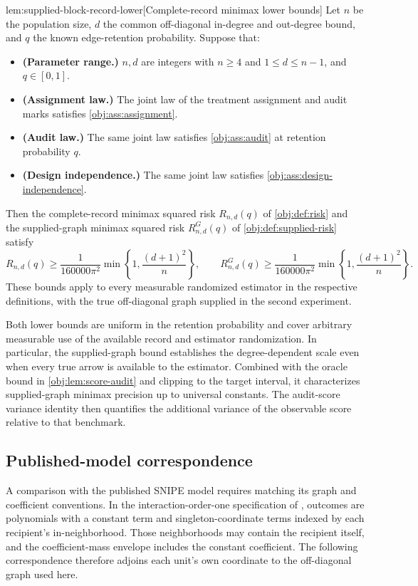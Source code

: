 \begin{lemmav}{lem:supplied-block-record-lower}[Complete-record minimax lower bounds]
Let \(n\) be the population size, \(d\) the common off-diagonal in-degree and out-degree bound, and \(q\) the known edge-retention probability. Suppose that:
\begin{itemize}
\item \textbf{(Parameter range.)} \(n,d\) are integers with \(n\ge4\) and \(1\le d\le n-1\), and \(q\in[0,1]\).
\item \textbf{(Assignment law.)} The joint law of the treatment assignment and audit marks satisfies \cref{obj:ass:assignment}.
\item \textbf{(Audit law.)} The same joint law satisfies \cref{obj:ass:audit} at retention probability \(q\).
\item \textbf{(Design independence.)} The same joint law satisfies \cref{obj:ass:design-independence}.
\end{itemize}
Then the complete-record minimax squared risk \(R_{n,d}(q)\) of \cref{obj:def:risk} and the supplied-graph minimax squared risk \(R^G_{n,d}(q)\) of \cref{obj:def:supplied-risk} satisfy
\[
R_{n,d}(q)\ge
\frac{1}{160000\pi^2}
\min\left\{1,\frac{(d+1)^2}{n}\right\},
\qquad
R^G_{n,d}(q)\ge
\frac{1}{160000\pi^2}
\min\left\{1,\frac{(d+1)^2}{n}\right\}.
\]
These bounds apply to every measurable randomized estimator in the respective definitions, with the true off-diagonal graph supplied in the second experiment.
\end{lemmav}

Both lower bounds are uniform in the retention probability and cover arbitrary measurable use of the available record and estimator randomization. In particular, the supplied-graph bound establishes the degree-dependent scale even when every true arrow is available to the estimator. Combined with the oracle bound in \cref{obj:lem:score-audit} and clipping to the target interval, it characterizes supplied-graph minimax precision up to universal constants. The audit-score variance identity then quantifies the additional variance of the observable score relative to that benchmark.

\subsection{Published-model correspondence}

A comparison with the published SNIPE model requires matching its graph and coefficient conventions. In the interaction-order-one specification of \citet[Sections 3.1--3.2, Assumptions 1--2, equations (3.2)--(3.3)]{CortezRodriguezEichhornYu2023SNIPE}, outcomes are polynomials with a constant term and singleton-coordinate terms indexed by each recipient's in-neighborhood. Those neighborhoods may contain the recipient itself, and the coefficient-mass envelope includes the constant coefficient. The following correspondence therefore adjoins each unit's own coordinate to the off-diagonal graph used here.

